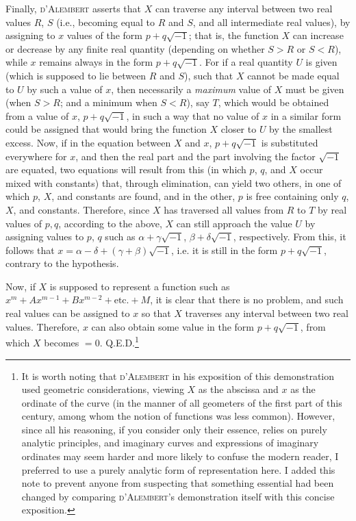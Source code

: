 \documentclass[12pt]{memoir}
\theoremstyle{plain}
\theoremstyle{remark}
\begin{document}
Finally, \textsc{d'Alembert} asserts that \(X\) can traverse any interval between two real values \(R\), \(S\) (i.e., becoming equal to \(R\) and \(S\), and all intermediate real values), by assigning to \(x\) values of the form \(p+q\surd{-1}\); that is, the function \(X\) can increase or decrease by any finite real quantity (depending on whether \(S>R\) or \(S<R\)), while \(x\) remains always in the form \(p+q\surd{-1}\). For if a real quantity \(U\) is given (which is supposed to lie between \(R\) and \(S\)), such that \(X\) cannot be made equal to \(U\) by such a value of \(x\), then necessarily a \textit{maximum} value of \(X\) must be given (when \(S>R\); and a minimum when \(S<R\)), say \(T\), which would be obtained from a value of \(x\), \(p+q\surd{-1}\), in such a way that no value of \(x\) in a similar form could be assigned that would bring the function \(X\) closer to \(U\) by the smallest excess. Now, if in the equation between \(X\) and \(x\), \(p+q\surd{-1}\) is substituted everywhere for \(x\), and then the real part and the part involving the factor \(\surd{-1}\) are equated, two equations will result from this (in which \(p\), \(q\), and \(X\) occur mixed with constants) that, through elimination, can yield two others, in one of which \(p\), \(X\), and constants are found, and in the other, \(p\) is free containing only \(q\), \(X\), and constants. Therefore, since \(X\) has traversed all values from \(R\) to \(T\) by real values of \(p, q\), according to the above, \(X\) can still approach the value \(U\) by assigning values to \(p\), \(q\) such as \(\alpha + \gamma \surd{-1}\), \(\beta + \delta\surd{-1}\), respectively. From this, it follows that \(x = \alpha - \delta + (\gamma + \beta)\surd{-1}\), i.e. it is still in the form \(p+q\surd{-1}\), contrary to the hypothesis.


Now, if \(X\) is supposed to represent a function such as \(x^m + Ax^{m-1} + Bx^{m-2} + \text{etc.} + M\), it is clear that there is no problem, and such real values can be assigned to \(x\) so that \(X\) traverses any interval between two real values. Therefore, \(x\) can also obtain some value in the form \(p+q\surd{-1}\), from which \(X\) becomes \(=0\). Q.E.D.\footnote{It is worth noting that \textsc{d'Alembert} in his exposition of this demonstration used geometric considerations, viewing \(X\) as the abscissa and \(x\) as the ordinate of the curve (in the manner of all geometers of the first part of this century, among whom the notion of functions was less common). However, since all his reasoning, if you consider only their essence, relies on purely analytic principles, and imaginary curves and expressions of imaginary ordinates may seem harder and more likely to confuse the modern reader, I preferred to use a purely analytic form of representation here. I added this note to prevent anyone from suspecting that something essential had been changed by comparing \textsc{d'Alembert}'s demonstration itself with this concise exposition.}
\end{document}
